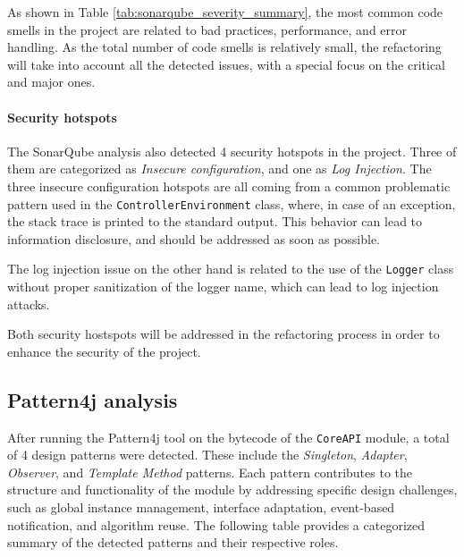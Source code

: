 \noindent As shown in Table \ref{tab:sonarqube_severity_summary}, the most common code smells in the project are related to bad practices, performance, and error handling. As the total number of code smells is relatively small, the refactoring will take into account all the detected issues, with a special focus on the critical and major ones.

\paragraph*{Security hotspots} The SonarQube analysis also detected 4 security hotspots in the project. Three of them are categorized as \textit{Insecure configuration}, and one as \textit{Log Injection}. The three insecure configuration hotspots are all coming from a common problematic pattern used in the \texttt{ControllerEnvironment} class, where, in case of an exception, the stack trace is printed to the standard output. This behavior can lead to information disclosure, and should be addressed as soon as possible.

The log injection issue on the other hand is related to the use of the \texttt{Logger} class without proper sanitization of the logger name, which can lead to log injection attacks.

Both security hostspots will be addressed in the refactoring process in order to enhance the security of the project.

\subsection{Pattern4j analysis}

After running the Pattern4j tool on the bytecode of the \texttt{CoreAPI} module, a total of 4 design patterns were detected. These include the \textit{Singleton}, \textit{Adapter}, \textit{Observer}, and \textit{Template Method} patterns. Each pattern contributes to the structure and functionality of the module by addressing specific design challenges, such as global instance management, interface adaptation, event-based notification, and algorithm reuse. The following table provides a categorized summary of the detected patterns and their respective roles.

